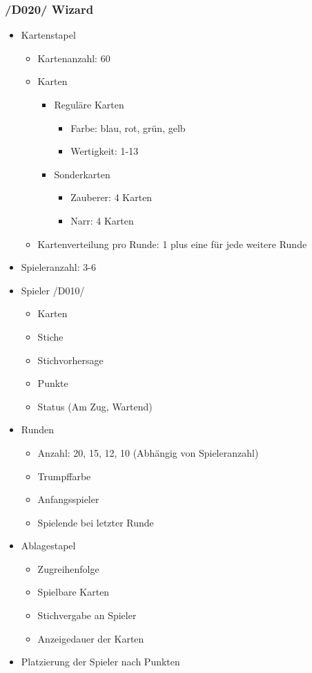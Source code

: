 \documentclass{article}
\begin{document}
\subsubsection{/D020/ Wizard}
\begin{itemize}
	\item Kartenstapel
	\begin{itemize}
		\item Kartenanzahl: 60
		\item Karten
		\begin{itemize}
			\item Reguläre Karten
			\begin{itemize}
				\item Farbe: blau, rot, grün, gelb
				\item Wertigkeit: 1-13	
			\end{itemize}
			\item Sonderkarten
			\begin{itemize}
				\item Zauberer: 4 Karten
				\item Narr: 4 Karten
			\end{itemize}			
		\end{itemize}	
		\item Kartenverteilung pro Runde: 1 plus eine für jede weitere Runde
	\end{itemize}
	\item Spieleranzahl: 3-6
	\item Spieler /D010/
	\begin{itemize}
		\item Karten
		\item Stiche
		\item Stichvorhersage
		\item Punkte
		\item Status (Am Zug, Wartend)
	\end{itemize}
	\item Runden
	\begin{itemize}
		\item Anzahl: 20, 15, 12, 10 (Abhängig von Spieleranzahl)
		\item Trumpffarbe
		\item Anfangsspieler
		\item Spielende bei letzter Runde
	\end{itemize}
	\item Ablagestapel
	\begin{itemize}
		\item Zugreihenfolge
		\item Spielbare Karten
		\item Stichvergabe an Spieler
		\item Anzeigedauer der Karten
	\end{itemize}
	\item Platzierung der Spieler nach Punkten
\end{itemize}
\end{document}
